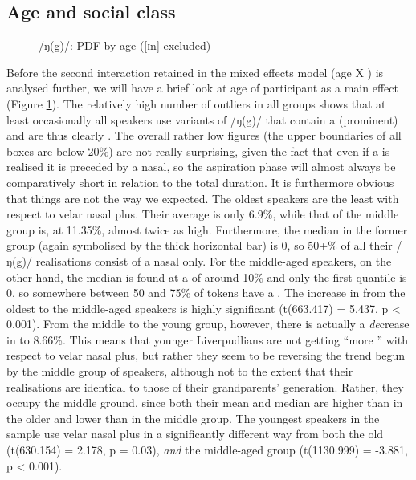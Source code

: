 \subsection{Age and social class}
\label{sec.prod.res.con.ng.ageclass}

\begin{figure}[h]
	\centering
		\resizebox{0.5\linewidth}{!}{} 
	\caption{/ŋ(g)/: PDF by age ([ɪn] excluded)}
	\label{fig.box.ng.tot}
\end{figure}

Before the second interaction retained in the mixed effects model (age X ) is analysed further, we will have a brief look at age of participant as a main effect (Figure \ref{fig.box.ng.tot}).
The relatively high number of outliers in all groups shows that at least occasionally all speakers use variants of /ŋ(g)/ that contain a (prominent)  and are thus clearly .
The overall rather low figures (the upper boundaries of all boxes are below 20\%) are not really surprising, given the fact that even if a  is realised it is preceded by a nasal, so the aspiration phase will almost always be comparatively short in relation to the total duration.
It is furthermore obvious that things are not the way we expected.
The oldest speakers are the least  with respect to velar nasal plus.
Their average  is only 6.9\%, while that of the middle group is, at 11.35\%, almost twice as high.
Furthermore, the median in the former group (again symbolised by the thick horizontal bar) is 0, so 50+\% of all their /ŋ(g)/ realisations consist of a nasal only.
For the middle-aged speakers, on the other hand, the median is found at a  of around 10\% and only the first quantile is 0, so somewhere between 50 and 75\% of tokens have a .
The increase in  from the oldest to the middle-aged speakers is highly significant (t(663.417) = 5.437, p < 0.001).
From the middle to the young group, however, there is actually a \emph{de}crease in  to 8.66\%.
This means that younger Liverpudlians are not getting ``more '' with respect to velar nasal plus, but rather they seem to be reversing the trend begun by the middle group of speakers, although not to the extent that their realisations are identical to those of their grandparents' generation.
Rather, they occupy the middle ground, since both their mean and median are higher than in the older and lower than in the middle group.
The youngest speakers in the sample use velar nasal plus in a significantly different way from both the old (t(630.154) = 2.178, p = 0.03), \emph{and} the middle-aged group (t(1130.999) = -3.881, p < 0.001).

